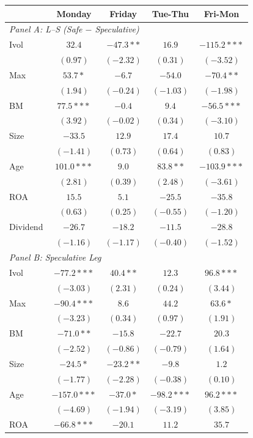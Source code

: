 \centering
\footnotesize
\begin{tabular}{l c c c c}
\toprule
 & Monday & Friday & Tue-Thu & Fri-Mon \\
\midrule
\multicolumn{5}{l}{\textit{Panel A: L--S (Safe $-$ Speculative)}} \\
Ivol & $32.4$ & $-47.3**$ & $16.9$ & $-115.2***$ \\
 & $(0.97)$ & $(-2.32)$ & $(0.31)$ & $(-3.52)$ \\
Max & $53.7*$ & $-6.7$ & $-54.0$ & $-70.4**$ \\
 & $(1.94)$ & $(-0.24)$ & $(-1.03)$ & $(-1.98)$ \\
BM & $77.5***$ & $-0.4$ & $9.4$ & $-56.5***$ \\
 & $(3.92)$ & $(-0.02)$ & $(0.34)$ & $(-3.10)$ \\
Size & $-33.5$ & $12.9$ & $17.4$ & $10.7$ \\
 & $(-1.41)$ & $(0.73)$ & $(0.64)$ & $(0.83)$ \\
Age & $101.0***$ & $9.0$ & $83.8**$ & $-103.9***$ \\
 & $(2.81)$ & $(0.39)$ & $(2.48)$ & $(-3.61)$ \\
ROA & $15.5$ & $5.1$ & $-25.5$ & $-35.8$ \\
 & $(0.63)$ & $(0.25)$ & $(-0.55)$ & $(-1.20)$ \\
Dividend & $-26.7$ & $-18.2$ & $-11.5$ & $-28.8$ \\
 & $(-1.16)$ & $(-1.17)$ & $(-0.40)$ & $(-1.52)$ \\
\midrule
\multicolumn{5}{l}{\textit{Panel B: Speculative Leg}} \\
Ivol & $-77.2***$ & $40.4**$ & $12.3$ & $96.8***$ \\
 & $(-3.03)$ & $(2.31)$ & $(0.24)$ & $(3.44)$ \\
Max & $-90.4***$ & $8.6$ & $44.2$ & $63.6*$ \\
 & $(-3.23)$ & $(0.34)$ & $(0.97)$ & $(1.91)$ \\
BM & $-71.0**$ & $-15.8$ & $-22.7$ & $20.3$ \\
 & $(-2.52)$ & $(-0.86)$ & $(-0.79)$ & $(1.64)$ \\
Size & $-24.5*$ & $-23.2**$ & $-9.8$ & $1.2$ \\
 & $(-1.77)$ & $(-2.28)$ & $(-0.38)$ & $(0.10)$ \\
Age & $-157.0***$ & $-37.0*$ & $-98.2***$ & $96.2***$ \\
 & $(-4.69)$ & $(-1.94)$ & $(-3.19)$ & $(3.85)$ \\
ROA & $-66.8***$ & $-20.1$ & $11.2$ & $35.7$ \\

\end{tabular}
